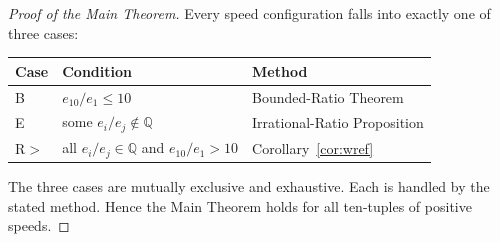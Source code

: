 \documentclass[12pt,a4paper]{amsart}
\theoremstyle{definition}
\theoremstyle{remark}
\begin{document}
\begin{proof}[Proof of the Main Theorem]
Every speed configuration falls into exactly one of three cases:

\medskip
\begin{center}
\begin{tabular}{lll}
\toprule
Case & Condition & Method \\
\midrule
B   & $e_{10}/e_1\le 10$                         & Bounded-Ratio Theorem \\
E   & some $e_i/e_j\notin\mathbb{Q}$             & Irrational-Ratio Proposition \\
R$>$ & all $e_i/e_j\in\mathbb{Q}$ and $e_{10}/e_1>10$ & Corollary~\ref{cor:wref} \\
\bottomrule
\end{tabular}
\end{center}

\medskip\noindent
The three cases are mutually exclusive and exhaustive. Each is handled by the stated
method. Hence the Main Theorem holds for all ten-tuples of positive speeds.
\end{proof}
\end{document}
